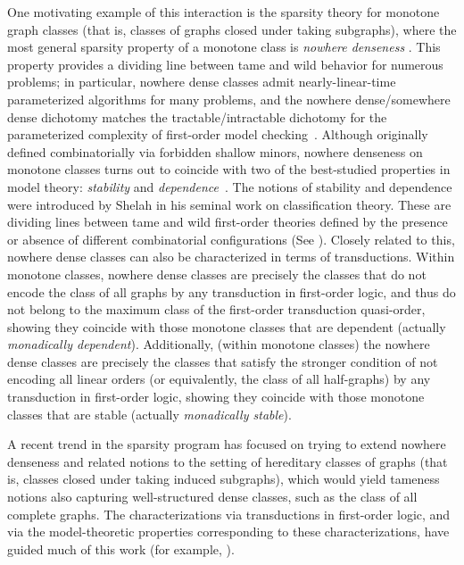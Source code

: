 \documentclass{lmcs}
\theoremstyle{definition}
\begin{document}
One motivating example of this interaction is the sparsity theory for monotone graph classes (that is, classes of graphs closed under taking subgraphs), where the most general sparsity property of a monotone class is \emph{nowhere denseness} \cite{Sparsity}. This property provides a dividing line between tame and wild behavior for numerous problems; in particular, nowhere dense classes admit nearly-linear-time parameterized algorithms for many problems, and the nowhere dense/somewhere dense dichotomy matches the tractable/intractable dichotomy for the parameterized complexity of first-order model checking~\cite{grohe2014deciding}. Although originally defined combinatorially via forbidden shallow minors, nowhere denseness on monotone classes turns out to coincide with two of the best-studied properties in model theory: \emph{stability} and \emph{dependence}~\cite{Podewski1978, adler2014interpreting}. 
The notions of stability and dependence were introduced by Shelah in his seminal work on classification theory. These are dividing lines between tame and wild first-order theories defined by the presence or absence of different combinatorial configurations (See \cite[Chapters 11 and 12]{poizat2012course}).
Closely related to this, nowhere dense classes can also be characterized in terms of transductions. 
Within monotone classes, nowhere dense classes are precisely the classes that do not encode the class of all graphs by any transduction in first-order logic, and thus do not belong to the maximum class of the first-order transduction quasi-order, showing they coincide with those monotone classes that are dependent (actually {\em monadically dependent}). Additionally, (within monotone classes) the nowhere dense classes are precisely the  classes that satisfy the stronger condition of not encoding all linear orders (or equivalently, the class of all half-graphs) by any transduction in first-order logic, showing they coincide with those monotone classes that are stable (actually {\em monadically stable}). 

A recent trend in the sparsity program has focused on trying to extend nowhere denseness and related notions to the setting of hereditary classes of graphs (that is, classes closed under taking  induced subgraphs), which would yield tameness notions also capturing well-structured dense classes, such as the class of all complete graphs. The characterizations via transductions in first-order logic, and via the model-theoretic properties corresponding to these characterizations, have guided much of this work (for example, \cite{gajarsky2020new, SBE_TOCL}). 
\end{document}
